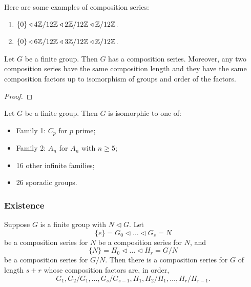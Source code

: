 \begin{example}
  Here are some examples of composition series:

  \begin{enumerate}
  \item \(\{0\} \triangleleft 4 \mathbb{Z} / 12 \mathbb{Z} \triangleleft 2\mathbb{Z} / 12\mathbb{Z} \triangleleft \mathbb{Z}/12\mathbb{Z}\).
  \item \(\{0\} \triangleleft 6 \mathbb{Z} / 12 \mathbb{Z} \triangleleft 3\mathbb{Z} / 12\mathbb{Z} \triangleleft \mathbb{Z}/12\mathbb{Z}\).
  \end{enumerate}
\end{example}

\begin{theorem}\label{thm:group-theory:Jordan-Holder}
  Let \(G\) be a finite group. Then \(G\) has a composition series. Moreover, any two composition series have the same composition length and they have the same composition factors up to isomorphism of groups and order of the factors.
\end{theorem}
\begin{proof}
\end{proof}

\begin{theorem}
  Let \(G\) be a finite group. Then \(G\) is isomorphic to one of:
  \begin{itemize}
    \item Family 1: \(C_{p}\) for \(p\) prime;
    \item Family 2: \(A_{n}\) for \(A_{n}\) with \(n \geq 5\);
    \item 16 other infinite families;
    \item 26 sporadic groups.
  \end{itemize}
\end{theorem}

\subsubsection*{Existence}
\begin{lemma}\label{lem:group-theory:composing-composition-series}
  Suppose \(G\) is a finite group with \(N \triangleleft G\). Let
  \[\{e\} = G_{0} \triangleleft \ldots \triangleleft G_{s} = N \]
  be a composition series for \(N\) be a composition series for \(N\), and
  \[\{N\} = H_{0} \triangleleft \ldots \triangleleft H_{r} = G / N\]
  be a composition series for \(G/N\). Then there is a composition series for \(G\) of length \(s + r\) whose composition factors are, in order,
  \[G_{1}, G_{2}/G_{1}, \ldots, G_{s}/ G_{s-1}, H_{1}, H_{2}/H_{1}, \ldots, H_{r}/H_{r-1}.\]
\end{lemma}

